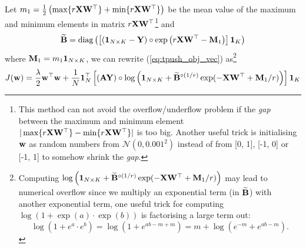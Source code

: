 Let $m_1 = \frac{1}{2} \left( \max\{r \mathbf{X} \mathbf{W}^\top\} + \min\{r \mathbf{X} \mathbf{W}^\top\} \right)$ 
be the mean value of the maximum and minimum elements in matrix $r \mathbf{X} \mathbf{W}^\top$\footnote{This method can not avoid the overflow/underflow problem if
the \emph{gap} between the maximum and minimum element $|\max\{r \mathbf{X} \mathbf{W}^\top\} - \min\{r \mathbf{X} \mathbf{W}^\top\}|$ is too big. 
Another useful trick is initialising $\mathbf{w}$ as random numbers from $\mathcal{N}(0, 0.001^2)$ instead of from [0, 1], [-1, 0] or [-1, 1]
to somehow shrink the \emph{gap}.}
and
$$
\widetilde{\mathbf{B}} = \text{diag} \left( \left[ \left( \mathbf{1}_{N \times K} - \mathbf{Y} \right) \circ \exp \left( r \mathbf{X} \mathbf{W}^\top - \mathbf{M}_1 \right) \right] \mathbf{1}_K \right)
$$
where $\mathbf{M}_1 = m_1 \mathbf{1}_{N \times K}$, we can rewrite (\ref{eq:tpush_obj_vec}) as\footnote{
Computing $\log \left( \mathbf{1}_{N \times K} + \widetilde{\mathbf{B}}^{\circ (1/r)} \exp(-\mathbf{X} \mathbf{W}^\top + \mathbf{M}_1 / r) \right)$ may lead to numerical overflow since
we multiply an exponential term (in $\widetilde{\mathbf{B}}$) with another exponential term, one useful trick for computing $\log(1 + \exp(a) \cdot \exp(b))$ is
factorising a large term out:
$$
\log(1 + e^{a} \cdot e^{b}) = \log(1 + e^{ab - m + m}) = m + \log(e^{-m} + e^{ab - m}).
$$
}
\begin{equation}
\label{eq:tpush_obj_vec2}
J(\mathbf{w}) 
= \frac{\lambda}{2} \mathbf{w}^\top \mathbf{w} + 
  \frac{1}{N} \mathbf{1}_N^\top \left[ \left( \mathbf{A} \mathbf{Y} \right) \circ \log \left( \mathbf{1}_{N \times K} + 
  \widetilde{\mathbf{B}}^{\circ (1/r)} \exp(-\mathbf{X} \mathbf{W}^\top + \mathbf{M}_1 / r) \right) \right] \mathbf{1}_K
\end{equation}


